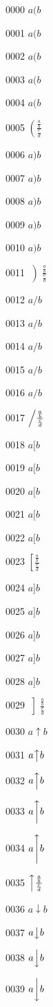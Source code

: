 \documentclass{article}
\begin{document}
0000 $a(b$\par
0001 $a\big(b$\par
0002 $a\Big(b$\par
0003 $a\bigg(b$\par
0004 $a\Bigg(b$\par
0005 $\left(\frac{\frac{a}{b}}{\frac{c}{d}}\right.$\par
0006 $a)b$\par
0007 $a\big)b$\par
0008 $a\Big)b$\par
0009 $a\bigg)b$\par
0010 $a\Bigg)b$\par
0011 $\left)\frac{\frac{a}{b}}{\frac{c}{d}}\right.$\par
0012 $a/b$\par
0013 $a\big/b$\par
0014 $a\Big/b$\par
0015 $a\bigg/b$\par
0016 $a\Bigg/b$\par
0017 $\left/\frac{\frac{a}{b}}{\frac{c}{d}}\right.$\par
0018 $a[b$\par
0019 $a\big[b$\par
0020 $a\Big[b$\par
0021 $a\bigg[b$\par
0022 $a\Bigg[b$\par
0023 $\left[\frac{\frac{a}{b}}{\frac{c}{d}}\right.$\par
0024 $a]b$\par
0025 $a\big]b$\par
0026 $a\Big]b$\par
0027 $a\bigg]b$\par
0028 $a\Bigg]b$\par
0029 $\left]\frac{\frac{a}{b}}{\frac{c}{d}}\right.$\par
0030 $a\uparrow b$\par
0031 $a\big\uparrow b$\par
0032 $a\Big\uparrow b$\par
0033 $a\bigg\uparrow b$\par
0034 $a\Bigg\uparrow b$\par
0035 $\left\uparrow \frac{\frac{a}{b}}{\frac{c}{d}}\right.$\par
0036 $a\downarrow b$\par
0037 $a\big\downarrow b$\par
0038 $a\Big\downarrow b$\par
0039 $a\bigg\downarrow b$\par
\end{document}
